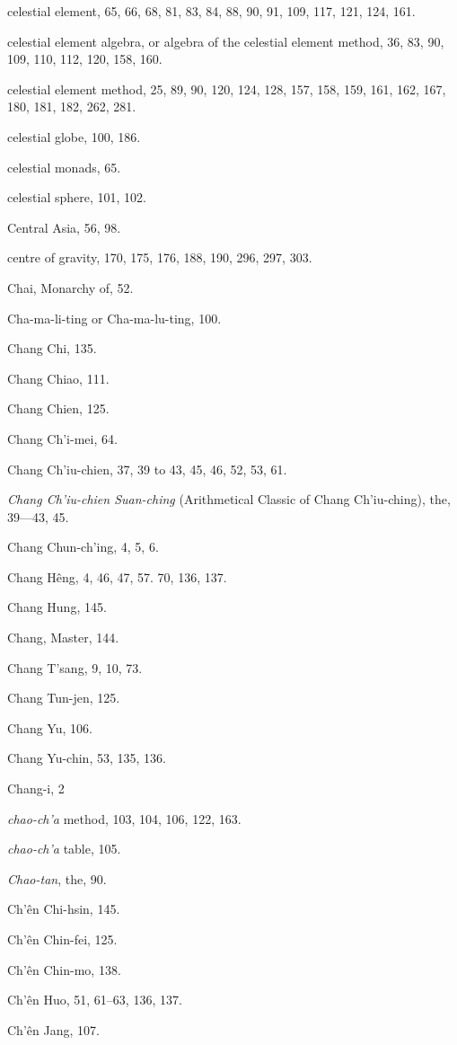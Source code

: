 \documentclass[11pt]{article}
\begin{document}
celestial element, 65, 66, 68, 81, 83, 84, 88, 90, 91, 109, 117, 121, 124, 161.\par
celestial element algebra, or algebra of the celestial element method, 36, 83, 90, 109, 110, 112, 120, 158, 160.\par
celestial element method, 25, 89, 90, 120, 124, 128, 157, 158, 159, 161, 162, 167, 180, 181, 182, 262, 281.\par
celestial globe, 100, 186.\par
celestial monads, 65.\par
celestial sphere, 101, 102.\par
Central Asia, 56, 98.\par
centre of gravity, 170, 175, 176, 188, 190, 296, 297, 303.\par
Chai, Monarchy of, 52.\par
Cha-ma-li-ting or Cha-ma-lu-ting, 100.\par
Chang Chi, 135.\par
Chang Chiao, 111.\par
Chang Chien, 125.\par
Chang Ch'i-mei, 64.\par
Chang Ch'iu-chien, 37, 39 to 43, 45, 46, 52, 53, 61.\par
\emph{Chang Ch'iu-chien Suan-ching} (Arithmetical Classic of Chang Ch'iu-ching), the, 39---43, 45.\par
Chang Chun-ch'ing, 4, 5, 6.\par
Chang Hêng, 4, 46, 47, 57. 70, 136, 137.\par
Chang Hung, 145.\par
Chang, Master, 144.\par
Chang T'sang, 9, 10, 73.\par
Chang Tun-jen, 125.\par
Chang Yu, 106.\par
Chang Yu-chin, 53, 135, 136.\par
Chang-i, 2\par
\emph{chao-ch'a} method, 103, 104, 106, 122, 163.\par
\emph{chao-ch'a} table, 105.\par
\emph{Chao-tan}, the, 90.\par
Ch'ên Chi-hsin, 145.\par
Ch'ên Chin-fei, 125.\par
Ch'ên Chin-mo, 138.\par
Ch'ên Huo, 51, 61--63, 136, 137.\par
Ch'ên Jang, 107.\par
\end{document}
